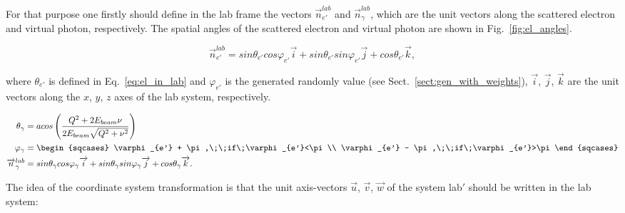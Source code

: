 \begin{enumerate}
For that purpose one firstly should define in the lab frame the vectors $\overrightarrow{n}_{e'}^{lab}$ and $\overrightarrow{n}_{\gamma}^{lab}$, which are the unit vectors along the scattered electron and virtual photon, respectively. The spatial angles of the scattered electron and virtual photon are shown in Fig.~\ref{fig:el_angles}. %

\begin{equation}
\overrightarrow{n}_{e'}^{lab} = sin\theta_{e'}cos\varphi_{e'}\overrightarrow{i} + sin\theta_{e'}sin\varphi_{e'}\overrightarrow{j} + cos\theta_{e'}\overrightarrow{k},
\end{equation}

where $\theta_{e'}$ is defined in Eq.~\eqref{eq:el_in_lab} and $\varphi_{e'}$ is the generated randomly value (see Sect.~\ref{sect:gen_with_weights}), $\overrightarrow{i}$, $\overrightarrow{j}$, $\overrightarrow{k}$ are the unit vectors along the $x$, $y$, $z$ axes of the lab system, respectively.

\begin{equation}
\begin{split}
\theta_{\gamma} &= acos \left ( \frac{Q^2+2E_{beam}\nu}{2E_{beam}\sqrt{Q^2+\nu^2}} \right )\\
\varphi_{\gamma} &= \begin{sqcases} 
\varphi_{e'} + \pi,\;\;if\;\varphi_{e'}<\pi \\ 
\varphi_{e'} - \pi,\;\;if\;\varphi_{e'}>\pi 
\end{sqcases}\\
\overrightarrow{n}_{\gamma}^{lab} &= sin\theta_{\gamma}cos\varphi_{\gamma}\overrightarrow{i} + sin\theta_{\gamma}sin\varphi_{\gamma}\overrightarrow{j} + cos\theta_{\gamma}\overrightarrow{k}.
\end{split}
\end{equation}


The idea of the coordinate system transformation is that the unit axis-vectors $\overrightarrow{u}$, $\overrightarrow{v}$, $\overrightarrow{w}$ of the system lab$'$ should be written in the lab system:


\end{enumerate}
